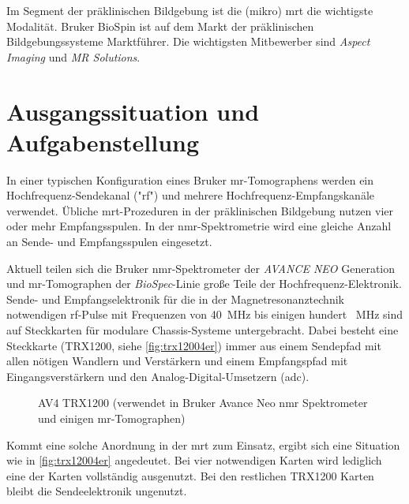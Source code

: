 Im Segment der präklinischen Bildgebung ist die (mikro) \gls{mrt} die wichtigste Modalität. Bruker BioSpin ist auf dem Markt der präklinischen Bildgebungssysteme Marktführer. Die wichtigsten Mitbewerber sind \textit{Aspect Imaging} und \textit{MR Solutions}.
 
\section{Ausgangssituation und Aufgabenstellung}
In einer typischen Konfiguration eines Bruker \gls{mr}-Tomographens werden ein Hochfrequenz-Sendekanal ("\gls{rf}") und mehrere Hochfrequenz-Empfangskanäle verwendet. Übliche \gls{mrt}-Prozeduren in der präklinischen Bildgebung nutzen vier oder mehr Empfangsspulen. In der \gls{nmr}-Spektrometrie wird eine gleiche Anzahl an Sende- und Empfangsspulen eingesetzt.

Aktuell teilen sich die Bruker \gls{nmr}-Spektrometer der \textit{AVANCE NEO} Generation und \gls{mr}-Tomographen der \textit{BioSpec}-Linie große Teile der Hochfrequenz-Elektronik. Sende- und Empfangselektronik für die in der Magnetresonanztechnik notwendigen \gls{rf}-Pulse mit Frequenzen von \SI{40}{\mega\hertz} bis einigen hundert \SI{}{\mega\hertz} sind auf Steckkarten für modulare Chassis-Systeme untergebracht. Dabei besteht eine Steckkarte (TRX1200, siehe \autoref{fig:trx12004er}) immer aus einem Sendepfad mit allen nötigen Wandlern und Verstärkern und einem Empfangspfad mit Eingangsverstärkern und den Analog-Digital-Umsetzern (\gls{adc}).

\begin{figure}[H]
	\centering
	\caption[Bruker Avance Neo TRX1200 Karte]{AV4 TRX1200 (verwendet in Bruker Avance Neo \gls{nmr} Spektrometer und einigen \gls{mr}-Tomographen)}
	\label{fig:trx12004er}
\end{figure}

Kommt eine solche Anordnung in der \gls{mrt} zum Einsatz, ergibt sich eine Situation wie in \autoref{fig:trx12004er} angedeutet. Bei vier notwendigen Karten wird lediglich eine der Karten vollständig ausgenutzt. Bei den restlichen TRX1200 Karten bleibt die Sendeelektronik ungenutzt.

